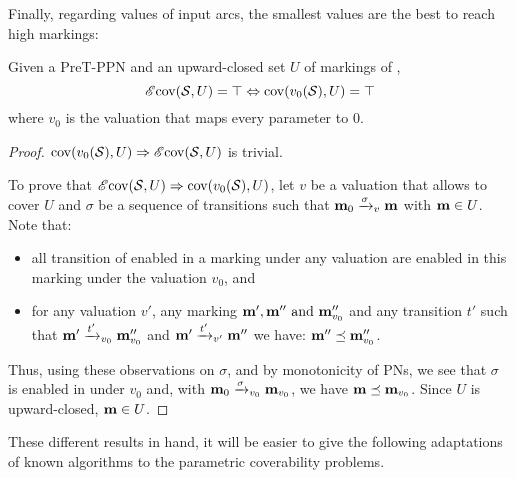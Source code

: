 Finally, regarding values of input arcs, the smallest values are the best to reach high markings:

\begin{theo}
  \label{theo:pre-e-zero-val}
  Given a PreT-\ac{PPN} \SPTPm and an upward-closed set $U$ of markings of \PPN, \[\EcovOp(\PPN, U) = \top \Leftrightarrow \covOp(v_0(\PPN), U) = \top\] where $v_0$ is the valuation that maps every parameter to $0$.
\end{theo}

\begin{proof}
  $\covOp(v_0(\PPN), U) \Rightarrow \EcovOp(\PPN, U)$ is trivial.

  To prove that $\EcovOp(\PPN, U) \Rightarrow \covOp(v_0(\PPN), U)$, let $v$ be a valuation that allows to cover $U$ and $\sigma$ be a sequence of transitions such that $\mari \fire[v]{\sigma} \mar$ with $\mar \in U$.
  Note that:
  \begin{itemize}
    \item all transition of \PPN enabled in a marking under any valuation are enabled in this marking under the valuation $v_0$, and
    \item for any valuation $v'$, any marking $\mar', \mar'' \text{ and } \mar''_{v_0}$ and any transition $t'$ such that $\mar' \fire[{v_0}]{t'} \mar''_{v_0}$ and $\mar' \fire[{v'}]{t'} \mar''$ we have: $\mar'' \preceq \mar''_{v_0}$.
  \end{itemize}

  Thus, using these observations on $\sigma$, and by monotonicity of \acp{PN}, we see that $\sigma$ is enabled in \mari under $v_0$ and, with $\mari \fire[{v_0}]{\sigma} \mar_{v_0}$, we have $\mar \preceq \mar_{v_0}$.
  Since $U$ is upward-closed, $\mar \in U$.
\end{proof}

These different results in hand, it will be easier to give the following adaptations of known algorithms to the parametric coverability problems.
